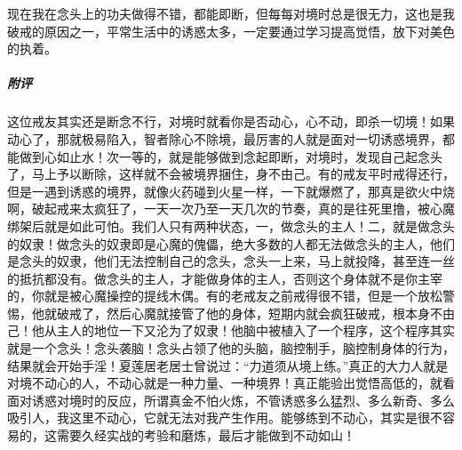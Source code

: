 \begin{case}
    现在我在念头上的功夫做得不错，都能即断，但每每对境时总是很无力，这也是我破戒的原因之一，平常生活中的诱惑太多，一定要通过学习提高觉悟，放下对美色的执着。
    \subparagraph{附评} 这位戒友其实还是断念不行，对境时就看你是否动心，心不动，即杀一切境！如果动心了，那就极易陷入，智者除心不除境，最厉害的人就是面对一切诱惑境界，都能做到心如止水！次一等的，就是能够做到念起即断，对境时，发现自己起念头了，马上予以断除，这样就不会被境界捆住，身不由己。有的戒友平时戒得还行，但是一遇到诱惑的境界，就像火药碰到火星一样，一下就爆燃了，那真是欲火中烧啊，破起戒来太疯狂了，一天一次乃至一天几次的节奏，真的是往死里撸，被心魔绑架后就是如此可怕。我们人只有两种状态，一，做念头的主人！二，就是做念头的奴隶！做念头的奴隶即是心魔的傀儡，绝大多数的人都无法做念头的主人，他们是念头的奴隶，他们无法控制自己的念头，念头一上来，马上就投降，甚至连一丝的抵抗都没有。做念头的主人，才能做身体的主人，否则这个身体就不是你主宰的，你就是被心魔操控的提线木偶。有的老戒友之前戒得很不错，但是一个放松警惕，他就破戒了，然后心魔就接管了他的身体，短期内就会疯狂破戒，根本身不由己！他从主人的地位一下又沦为了奴隶！他脑中被植入了一个程序，这个程序其实就是一个念头！念头袭脑！念头占领了他的头脑，脑控制手，脑控制身体的行为，结果就会开始手淫！夏莲居老居士曾说过：“力道须从境上练。”真正的大力人就是对境不动心的人，不动心就是一种力量、一种境界！真正能验出觉悟高低的，就看面对诱惑对境时的反应，所谓真金不怕火炼，不管诱惑多么猛烈、多么新奇、多么吸引人，我这里不动心，它就无法对我产生作用。能够练到不动心，其实是很不容易的，这需要久经实战的考验和磨炼，最后才能做到不动如山！
\end{case}

